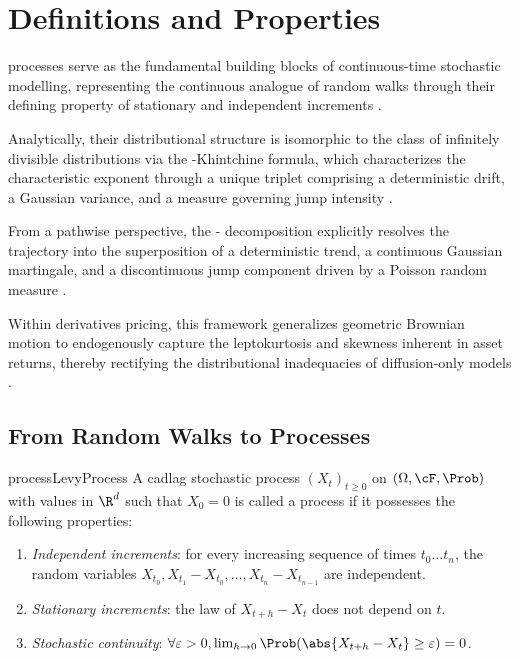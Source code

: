 \section{Definitions and Properties}

\Levy{} processes serve as the fundamental building blocks of continuous-time stochastic modelling, representing the continuous analogue of random walks through their defining property of stationary and independent increments \parencite{sato_levy_2013, schilling_introduction_2016}.

Analytically, their distributional structure is isomorphic to the class of infinitely divisible distributions via the \Levy{}-Khintchine formula, which characterizes the characteristic exponent through a unique triplet comprising a deterministic drift, a Gaussian variance, and a \Levy{} measure governing jump intensity \parencite{applebaum_levy_2013}.

From a pathwise perspective, the \Levy{}-\Ito{} decomposition explicitly resolves the trajectory into the superposition of a deterministic trend, a continuous Gaussian martingale, and a discontinuous jump component driven by a Poisson random measure \parencite{kyprianou_fluctuations_2014}.

Within derivatives pricing, this framework generalizes geometric Brownian motion to endogenously capture the leptokurtosis and skewness inherent in asset returns, thereby rectifying the distributional inadequacies of diffusion-only models \parencite{cont_financial_2004}.

\subsection{From Random Walks to \Levy{} Processes}

\begin{defn}{\Levy{} process}{LevyProcess}
	A cadlag\footnotemark{} stochastic process $(X_t)_{t \ge 0}$ on $(\Omega, \cF, \Prob)$ with values in $\R^d$ such that $X_0 = 0$ is called a \Levy{} process if it possesses the following properties:
	\begin{enumerate}[label=\arabic*.]
		\item \emph{Independent increments}: for every increasing sequence of times $t_0 \dots t_n$, the random variables $X_{t_0}, X_{t_1} - X_{t_0}, \dots, X_{t_n} - X_{t_{n-1}}$ are independent.
		\item \emph{Stationary increments}: the law of $X_{t+h} - X_t$ does not depend on $t$.
		\item \emph{Stochastic continuity}: $\forall \varepsilon > 0, \lim_{h \to 0} \Prob(\abs{X_{t+h} - X_t} \ge \varepsilon) = 0$.
	\end{enumerate}
\end{defn}

